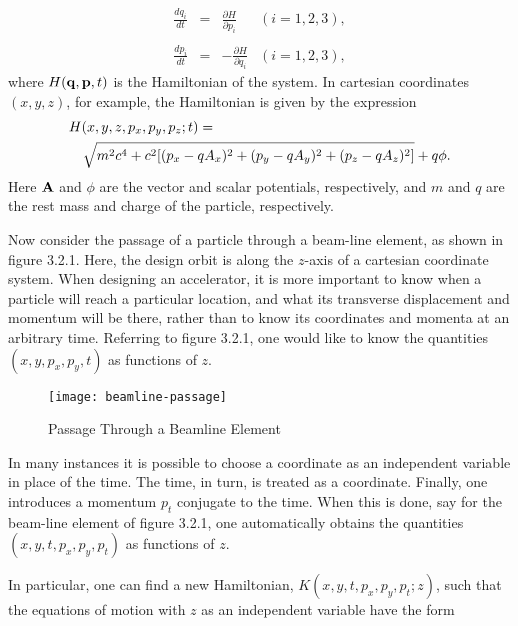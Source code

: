 \begin{equation}
\begin{array}{llll}
	      {\displaystyle  \frac{dq_i}{dt}} & =  & {\displaystyle \frac{\partial H}{\partial p_i}} & (i=1,2,3), \\
	      \\
      {\displaystyle  \frac{dp_i}{dt}} & = & - {\displaystyle \frac{\partial H}{\partial q_i}} & (i=1,2,3),
\end{array}
\end{equation}
where $H({\bf q},{\bf p},t)$ is the Hamiltonian of the system.  In cartesian
coordinates $(x,y,z)$, for example, the Hamiltonian is given by the
expression
\begin{eqnarray}
\lefteqn{H(x,y,z,p_x,p_y,p_z ;t) =} \nonumber \\
 & & \sqrt{m^2 c^4 + c^2 [(p_x -qA_x)^2 + (p_y - qA_y)^2 + (p_z - qA_z)^2]} + q\phi .
\end{eqnarray}
Here ${\bf A}$ and $\phi$ are the vector and scalar potentials, respectively, and $m$  and
$q$ are the rest mass and charge of the particle, respectively.

     Now consider the passage of a particle through a beam-line element, as
shown in figure 3.2.1.  Here, the design orbit is along the $z$-axis of a
cartesian coordinate system.  When designing an accelerator, it is more
important to know when a particle will reach a particular location, and
what its transverse displacement and momentum will be there, rather than to
know its coordinates and momenta at an arbitrary time.  Referring to figure
3.2.1, one would like to know the quantities $(x,y,p_x,p_y,t)$ as functions of $z$. 

\begin{figure}[p]
  \centering
  \texttt{[image: beamline-passage]}
  \caption{Passage Through a Beamline Element}
\end{figure}

     In many instances it is possible to choose a coordinate as an
independent variable in place of the time.  The time, in turn, is treated
as a coordinate. Finally, one introduces a momentum $p_t$ conjugate to the
time.  When this is done, say for the beam-line element of figure 3.2.1, one
automatically obtains the quantities $(x,y,t,p_x,p_y,p_t)$ as functions of $z$.

     In particular, one can find a new Hamiltonian, $K(x,y,t,p_x,p_y,p_t ;z)$,
such that the equations of motion with $z$ as an independent variable have
the form

